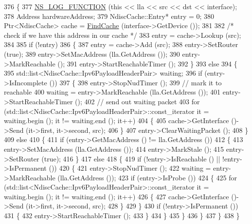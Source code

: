 \begin{DoxyCode}
376 \{
377   \hyperlink{log-macros-disabled_8h_a90b90d5bad1f39cb1b64923ea94c0761}{NS\_LOG\_FUNCTION} (\textcolor{keyword}{this} << lla << src << dst << interface);
378   Address hardwareAddress;
379   NdiscCache::Entry* entry = 0;
380   Ptr<NdiscCache> cache = \hyperlink{classns3_1_1Icmpv6L4Protocol_a90167126423f3957718e22a8bcd325c8}{FindCache} (interface->GetDevice ());
381 
382   \textcolor{comment}{/* check if we have this address in our cache */}
383   entry = cache->Lookup (src);
384 
385   \textcolor{keywordflow}{if} (!entry)
386     \{
387       entry = cache->Add (src);
388       entry->SetRouter (\textcolor{keyword}{true});
389       entry->SetMacAddress (lla.GetAddress ());
390       entry->MarkReachable ();
391       entry->StartReachableTimer ();
392     \}
393   \textcolor{keywordflow}{else}
394     \{
395       std::list<NdiscCache::Ipv6PayloadHeaderPair> waiting;
396       \textcolor{keywordflow}{if} (entry->IsIncomplete ())
397         \{
398           entry->StopNudTimer ();
399           \textcolor{comment}{// mark it to reachable}
400           waiting = entry->MarkReachable (lla.GetAddress ());
401           entry->StartReachableTimer ();
402           \textcolor{comment}{// send out waiting packet}
403           \textcolor{keywordflow}{for} (std::list<NdiscCache::Ipv6PayloadHeaderPair>::const\_iterator it = waiting.begin (); it != 
      waiting.end (); it++)
404             \{
405               cache->GetInterface ()->Send (it->first, it->second, src);
406             \}
407           entry->ClearWaitingPacket ();
408         \}
409       \textcolor{keywordflow}{else}
410         \{
411           \textcolor{keywordflow}{if} (entry->GetMacAddress () != lla.GetAddress ())
412             \{
413               entry->SetMacAddress (lla.GetAddress ());
414               entry->MarkStale ();
415               entry->SetRouter (\textcolor{keyword}{true});
416             \}
417           \textcolor{keywordflow}{else}
418             \{
419               \textcolor{keywordflow}{if} (!entry->IsReachable () || !entry->IsPermanent ())
420                 \{
421                   entry->StopNudTimer ();
422                   waiting = entry->MarkReachable (lla.GetAddress ());
423                   \textcolor{keywordflow}{if} (entry->IsProbe ())
424                     \{
425                       \textcolor{keywordflow}{for} (std::list<NdiscCache::Ipv6PayloadHeaderPair>::const\_iterator it = waiting.begin 
      (); it != waiting.end (); it++)
426                         \{
427                           cache->GetInterface ()->Send (it->first, it->second, src);
428                         \}
429                     \}
430                   \textcolor{keywordflow}{if} (!entry->IsPermanent ())
431                     \{
432                       entry->StartReachableTimer ();
433                     \}
434                 \}
435             \}
436         \}
437     \}
438 \}
\end{DoxyCode}


